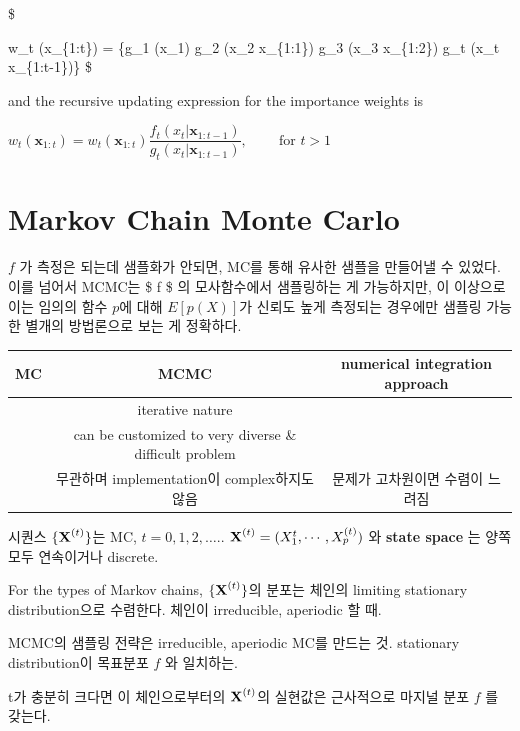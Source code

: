 \documentclass[
]{book}
\begin{document}
\$

w\_t (\pmb x\_\{1:t\}) =  \{g\_1 (x\_1) \ast g\_2 (x\_2 \rvert \pmb x\_\{1:1\}) \ast g\_3 (x\_3 \rvert \pmb x\_\{1:2\}) \cdots \ast g\_t (x\_t \rvert \pmb x\_\{1:t-1\})\}
\$

and the recursive updating expression for the importance weights is

\(w_t(\pmb x_{1:t}) = w_t(\pmb x_{1:t}) \dfrac {f_t (x_t \rvert \pmb x_{1:t-1})}{g_t (x_t \rvert \pmb x_{1:t-1})}, \; \; \; \; \; \; \; \; \text{for }t>1\)

\hypertarget{markov-chain-monte-carlo}{%
\section{Markov Chain Monte Carlo}\label{markov-chain-monte-carlo}}

\(f\) 가 측정은 되는데 샘플화가 안되면, MC를 통해 유사한 샘플을 만들어낼 수 있었다. 이를 넘어서 MCMC는 \$ f \$ 의 모사함수에서 샘플링하는 게 가능하지만, 이 이상으로 이는 임의의 함수 \(p\)에 대해 \(E[p(X)]\)가 신뢰도 높게 측정되는 경우에만 샘플링 가능한 별개의 방법론으로 보는 게 정확하다.

\begin{longtable}[]{@{}ccc@{}}
\toprule
MC & MCMC & numerical integration approach \\
\midrule
\endhead
& iterative nature & \\
& can be customized to very diverse \& difficult problem & \\
& 무관하며 implementation이 complex하지도 않음 & 문제가 고차원이면 수렴이 느려짐 \\
\bottomrule
\end{longtable}

시퀀스 \(\{\textbf X^{(t)}\}\)는 MC, \(t = 0, 1, 2, ….\). \(\textbf X^{(t)} = (X_1^{t} , \cdots, X_p^{(t)})\) 와 \textbf{state space} 는 양쪽 모두 연속이거나 discrete.

For the types of Markov chains, \(\{ \textbf X^{(t)} \}\)의 분포는 체인의 limiting stationary distribution으로 수렴한다. 체인이 irreducible, aperiodic 할 때.

MCMC의 샘플링 전략은 irreducible, aperiodic MC를 만드는 것. stationary distribution이 목표분포 \(f\) 와 일치하는.

t가 충분히 크다면 이 체인으로부터의 \(\textbf X^{(t)}\)의 실현값은 근사적으로 마지널 분포 \(f\) 를 갖는다.
\end{document}
